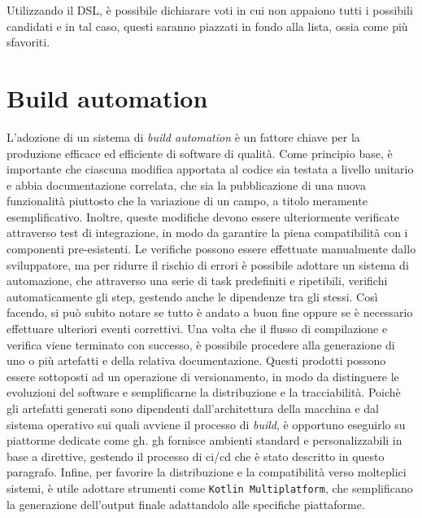 \documentclass[12pt,a4paper,openright,twoside]{book}
\begin{document}
Utilizzando il DSL, è possibile dichiarare voti in cui non appaiono tutti i possibili candidati e in tal caso,
questi saranno piazzati in fondo alla lista, ossia come più sfavoriti.
\section{Build automation}
L'adozione di un sistema di \textit{build automation} è un fattore chiave per la produzione
efficace ed efficiente di software di qualità.
Come principio base, è importante che ciascuna modifica apportata al codice
sia testata a livello unitario e abbia documentazione correlata, che sia la pubblicazione 
di una nuova funzionalità piuttosto che la variazione di un campo, a titolo meramente
esemplificativo. 
Inoltre, queste modifiche devono essere ulteriormente 
verificate attraverso test di integrazione, in modo da garantire la piena
compatibilità con i componenti pre-esistenti. 
Le verifiche possono essere effettuate 
manualmente dallo sviluppatore, ma per ridurre il rischio di errori è
possibile adottare un sistema di automazione, che attraverso una serie di task predefiniti
e ripetibili, verifichi automaticamente gli step,
gestendo anche le dipendenze tra gli stessi.
Così facendo, si può subito notare se tutto è andato a buon fine oppure 
se è necessario effettuare ulteriori eventi correttivi.
Una volta che il flusso di compilazione e verifica viene terminato con successo,
è possibile procedere alla generazione di uno o più artefatti e della relativa documentazione.
Questi prodotti possono essere sottoposti ad un operazione di versionamento,
in modo da distinguere le evoluzioni del software e semplificarne la distribuzione
e la tracciabilità.
Poichè gli artefatti generati sono dipendenti dall'architettura della macchina
e dal sistema operativo sui quali avviene il processo di \textit{build}, è opportuno eseguirlo
su piattorme dedicate come \ac{gh}.
\ac{gh} fornisce ambienti standard e personalizzabili
in base a direttive, gestendo il processo di \ac{ci}/\ac{cd} che è stato descritto in questo paragrafo. 
Infine, per favorire la distribuzione e la compatibilità verso molteplici sistemi,
è utile adottare strumenti come \texttt{Kotlin Multiplatform},
che semplificano la generazione dell'output finale adattandolo alle specifiche piattaforme. 
\end{document}
